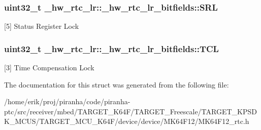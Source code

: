 \subsubsection[{\texorpdfstring{S\+RL}{SRL}}]{\setlength{\rightskip}{0pt plus 5cm}uint32\+\_\+t \+\_\+hw\+\_\+rtc\+\_\+lr\+::\+\_\+hw\+\_\+rtc\+\_\+lr\+\_\+bitfields\+::\+S\+RL}\hypertarget{struct__hw__rtc__lr_1_1__hw__rtc__lr__bitfields_ae0a22727fb62dc9c53ebd7d18e210cc4}{}\label{struct__hw__rtc__lr_1_1__hw__rtc__lr__bitfields_ae0a22727fb62dc9c53ebd7d18e210cc4}
\mbox{[}5\mbox{]} Status Register Lock 
\subsubsection[{\texorpdfstring{T\+CL}{TCL}}]{\setlength{\rightskip}{0pt plus 5cm}uint32\+\_\+t \+\_\+hw\+\_\+rtc\+\_\+lr\+::\+\_\+hw\+\_\+rtc\+\_\+lr\+\_\+bitfields\+::\+T\+CL}\hypertarget{struct__hw__rtc__lr_1_1__hw__rtc__lr__bitfields_abdabd5035e0036ec6755542a1c1411b6}{}\label{struct__hw__rtc__lr_1_1__hw__rtc__lr__bitfields_abdabd5035e0036ec6755542a1c1411b6}
\mbox{[}3\mbox{]} Time Compensation Lock 

The documentation for this struct was generated from the following file\+:\begin{DoxyCompactItemize}
\item 
/home/erik/proj/piranha/code/piranha-\/ptc/src/receiver/mbed/\+T\+A\+R\+G\+E\+T\+\_\+\+K64\+F/\+T\+A\+R\+G\+E\+T\+\_\+\+Freescale/\+T\+A\+R\+G\+E\+T\+\_\+\+K\+P\+S\+D\+K\+\_\+\+M\+C\+U\+S/\+T\+A\+R\+G\+E\+T\+\_\+\+M\+C\+U\+\_\+\+K64\+F/device/device/\+M\+K64\+F12/M\+K64\+F12\+\_\+rtc.\+h\end{DoxyCompactItemize}
